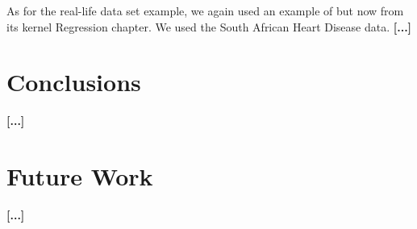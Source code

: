 \documentclass{article}
\begin{document}
As for the real-life data set example, we again used an example of \citet{ESL} but now from
its kernel Regression chapter. We used the South African Heart Disease data. \textbf{[...]}

\citet{ADAfaEPoV}


\section{Conclusions}

\textbf{[...]}

\section{Future Work}

\textbf{[...]}


\end{document}
